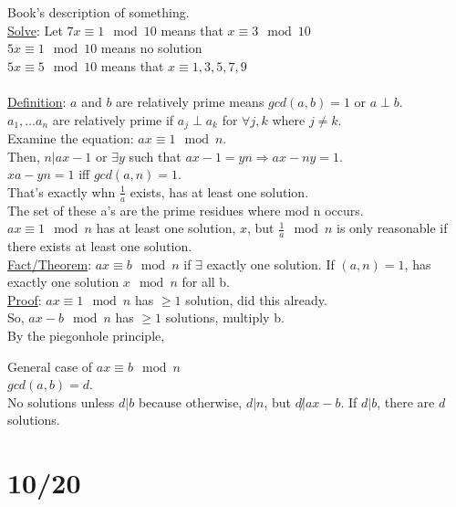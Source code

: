 \documentclass[13pt]{article}
\begin{document}
	Book's description of something.\\
	\underline{Solve}: Let
	$7x \equiv 1 \mod 10$ means that $x \equiv 3 \mod 10$ \\
	$5x \equiv 1 \mod 10$ means no solution \\
	$5x \equiv 5 \mod 10$ means that $x \equiv 1, 3, 5, 7, 9$\\\\
	\underline{Definition}: $a$ and $b$ are relatively prime means $gcd(a,b)=1$
	or $a \perp b$.\\
	$a_1, \ldots a_n$ are relatively prime if $a_j \perp a_k$ for $\forall
	j,k$ where $j \not= k$.\\
	Examine the equation: $ax \equiv 1 \mod n$.\\
	Then, $n | ax - 1$ or $\exists y$ such that $ax - 1 = yn \Rightarrow 
	ax - ny = 1$.\\
	$xa - yn = 1$ iff $gcd(a,n) = 1$.\\
	That's exactly whn $\frac{1}{a}$ exists, has at least one solution. \\
	The set of these a's are the prime residues where mod n occurs. \\
	$ax \equiv 1 \mod n$ has at least one solution, $x$, but $\frac{1}{a}
	\mod n$ is only reasonable if there exists at least one solution.\\
	\underline{Fact/Theorem}: $ax \equiv b \mod n$ if $\exists $ exactly one
	solution. If $(a, n) = 1$, has exactly one solution $x \mod n$ for all
	b.\\
	\underline{Proof}:
		$ax \equiv 1 \mod n$ has $\ge 1$ solution, did this already.\\
		So, $ax - b \mod n$ has $\ge 1$ solutions, multiply b.\\
		By the piegonhole principle, 

	General case of $ax \equiv b \mod n$\\
	$gcd(a,b) = d$.\\
	No solutions unless $d | b$ because otherwise, $d|n$, but $d \not| ax -b$.
	If $d | b$, there are $d$ solutions.

\section*{10/20}
\end{document}
